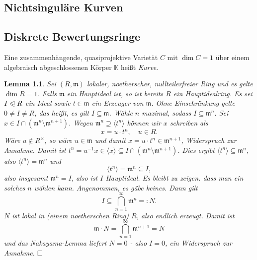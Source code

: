 \documentclass[11pt]{book}
\newtheorem{lemma}[theorem]{Lemma}
\theoremstyle{nonumberbreak}
\newenvironment{defin}[1][]{\ifthenelse{\equal{#1}{}}{\definition}{\definition[#1]}\rm}{\enddefinition}
\newenvironment{pr}[1][]{\ifthenelse{\equal{#1}{}}{\proof}{\proof[#1]}\rm}{\endproof}
\begin{document}
\begin{spacing}{1.3}


\chapter{Nichtsinguläre Kurven}


\setcounter{section}{14}

\renewcommand*\thesection{§ \arabic{section}\quad}
\section{Diskrete Bewertungsringe} %
\renewcommand*\thesection{\arabic{section}}

\begin{defin}
Eine zusammenhängende, quasiprojektive Varietät $C$ mit $\dim C=1$ über einem algebraisch abgeschlossenen Körper $\mathbb{K}$ heißt \textit{Kurve}.
\end{defin}

\begin{lemma} %

Sei $(R, \mathfrak{m})$ lokaler, noetherscher, nullteilerfreier Ring und es gelte $\dim R=1$. 
Falls $\mathfrak{m}$ ein Hauptideal ist, so ist bereits $R$ ein Hauptidealring.
\begin{pr}
Es sei $I \trianglelefteqslant R$ ein Ideal sowie $t \in \mathfrak{m}$ ein Erzeuger von $\mathfrak{m}$. Ohne Einschränkung gelte $0 \neq I \neq R$, das heißt, es gilt $I \subseteq \mathfrak{m}$. Wähle $n$ maximal, sodass $I \subseteq \mathfrak{m}^n$. Sei $x \in I \cap \left(\mathfrak{m}^n \setminus \mathfrak{m}^{n+1}\right)$. Wegen $\mathfrak{m}^n \supseteq \langle t^n \rangle$ können wir $x$ schreiben als
$$x= u \cdot t^n, \quad u \in R.$$
Wäre $u \notin R^{\times}$, so wäre $u \in \mathfrak{m}$ und damit $x= u \cdot t^n\in \mathfrak{m}^{n+1}$, Widerspruch zur Annahme. Damit ist $t^n = u^{-1} x \in \langle x \rangle \subseteq I \cap \left( \mathfrak{m}^n \setminus \mathfrak{m}^{n+1} \right)$. Dies ergibt $\langle t^n \rangle \subseteq \mathfrak{m}^n$, also $\langle t ^n\rangle = \mathfrak{m}^n$ und
$$ \langle t^n \rangle = \mathfrak{m}^n \subseteq I,$$
also insgesamt $\mathfrak{m}^n=I$, also ist $I$ Hauptideal. Es bleibt zu zeigen. dass man ein solches $n$ wählen kann. Angenommen, es gäbe keines. Dann gilt
$$I \subseteq \bigcap _{n=1}^{\infty} \mathfrak{m}^n =: N.$$
$N$ ist lokal in (einem noetherschen Ring) $R$, also endlich erzeugt. Damit ist
$$\mathfrak{m} \cdot N = \bigcap _{n=1}^{\infty} \mathfrak{m}^{n+1} = N$$
und das Nakayama-Lemma liefert $N=0$ - also $I=0$, ein Widerspruch zur Annahme. $\hfill \Box$
\end{pr}
\end{lemma}





\end{spacing}
\end{document}
